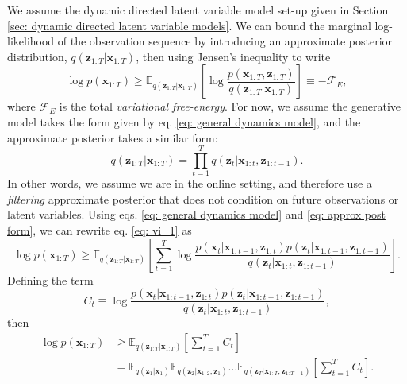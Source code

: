 We assume the dynamic directed latent variable model set-up given in Section \ref{sec: dynamic directed latent variable models}. We can bound the marginal log-likelihood of the observation sequence by introducing an approximate posterior distribution, $q(\mathbf{z}_{1:T} | \mathbf{x}_{1:T})$, then using Jensen's inequality to write
\begin{equation}
    \log p(\mathbf{x}_{1:T}) \geq \mathbb{E}_{q(\mathbf{z}_{1:T} | \mathbf{x}_{1:T})} \left[ \log \frac{p(\mathbf{x}_{1:T} , \mathbf{z}_{1:T})}{q(\mathbf{z}_{1:T} | \mathbf{x}_{1:T})} \right] \equiv - \mathcal{F}_E,
    \label{eq: vi_1}
\end{equation}
where $\mathcal{F}_E$ is the total \textit{variational free-energy}. For now, we assume the generative model takes the form given by eq. \ref{eq: general dynamics model}, and the approximate posterior takes a similar form:
\begin{equation}
    q(\mathbf{z}_{1:T} | \mathbf{x}_{1:T}) = \prod_{t=1}^T q(\mathbf{z}_t | \mathbf{x}_{1:t} , \mathbf{z}_{1:t-1}).
    \label{eq: approx post form}
\end{equation}
In other words, we assume we are in the online setting, and therefore use a \textit{filtering} approximate posterior that does not condition on future observations or latent variables. Using eqs. \ref{eq: general dynamics model} and \ref{eq: approx post form}, we can rewrite eq. \ref{eq: vi_1} as
\begin{equation}
    \log p(\mathbf{x}_{1:T}) \geq \mathbb{E}_{q(\mathbf{z}_{1:T} | \mathbf{x}_{1:T})} \left[ \sum_{t=1}^T \log \frac{p(\mathbf{x}_t | \mathbf{x}_{1:t-1} , \mathbf{z}_{1:t}) p(\mathbf{z}_t | \mathbf{x}_{1:t-1} , \mathbf{z}_{1:t-1})}{q(\mathbf{z}_t | \mathbf{x}_{1:t} , \mathbf{z}_{1:t-1})} \right].
\end{equation}
Defining the term
\begin{equation}
    C_t \equiv \log \frac{p(\mathbf{x}_t | \mathbf{x}_{1:t-1} , \mathbf{z}_{1:t}) p(\mathbf{z}_t | \mathbf{x}_{1:t-1} , \mathbf{z}_{1:t-1})}{q(\mathbf{z}_t | \mathbf{x}_{1:t} , \mathbf{z}_{1:t-1})},
\end{equation}
then
\begin{align}
    \log p(\mathbf{x}_{1:T}) & \geq \mathbb{E}_{q(\mathbf{z}_{1:T} | \mathbf{x}_{1:T})} \left[ \sum_{t=1}^T C_t \right] \\
    & = \mathbb{E}_{q(\mathbf{z}_1 | \mathbf{x}_1)} \mathbb{E}_{q(\mathbf{z}_2 | \mathbf{x}_{1:2} , \mathbf{z}_1)} \dots \mathbb{E}_{q(\mathbf{z}_T | \mathbf{x}_{1:T} , \mathbf{z}_{1:T-1})} \left[ \sum_{t=1}^T C_t \right].
\end{align}
